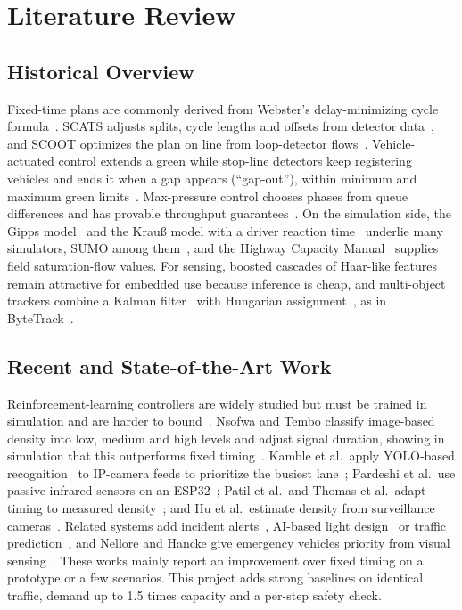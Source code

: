 \chapter{Literature Review}
\label{chap:lit}

\section{Historical Overview}
Fixed-time plans are commonly derived from Webster's delay-minimizing cycle formula~\cite{ref2}. SCATS adjusts splits, cycle lengths and offsets from detector data~\cite{ref3}, and SCOOT optimizes the plan on line from loop-detector flows~\cite{ref4}. Vehicle-actuated control extends a green while stop-line detectors keep registering vehicles and ends it when a gap appears (``gap-out''), within minimum and maximum green limits~\cite{ref23}. Max-pressure control chooses phases from queue differences and has provable throughput guarantees~\cite{ref11}. On the simulation side, the Gipps model~\cite{ref21} and the Krau{\ss} model with a driver reaction time~\cite{ref25} underlie many simulators, SUMO among them~\cite{ref22}, and the Highway Capacity Manual~\cite{ref24} supplies field saturation-flow values. For sensing, boosted cascades of Haar-like features~\cite{ref16} remain attractive for embedded use because inference is cheap, and multi-object trackers combine a Kalman filter~\cite{ref18} with Hungarian assignment~\cite{ref19}, as in ByteTrack~\cite{ref17}.

\section{Recent and State-of-the-Art Work}
Reinforcement-learning controllers are widely studied but must be trained in simulation and are harder to bound~\cite{ref12}. Nsofwa and Tembo classify image-based density into low, medium and high levels and adjust signal duration, showing in simulation that this outperforms fixed timing~\cite{ref1}. Kamble et al.\ apply YOLO-based recognition~\cite{ref7} to IP-camera feeds to prioritize the busiest lane~\cite{ref6}; Pardeshi et al.\ use passive infrared sensors on an ESP32~\cite{ref5}; Patil et al.\ and Thomas et al.\ adapt timing to measured density~\cite{ref9,ref10}; and Hu et al.\ estimate density from surveillance cameras~\cite{ref8}. Related systems add incident alerts~\cite{ref13}, AI-based light design~\cite{ref14} or traffic prediction~\cite{ref15}, and Nellore and Hancke give emergency vehicles priority from visual sensing~\cite{ref20}. These works mainly report an improvement over fixed timing on a prototype or a few scenarios. This project adds strong baselines on identical traffic, demand up to 1.5 times capacity and a per-step safety check.

